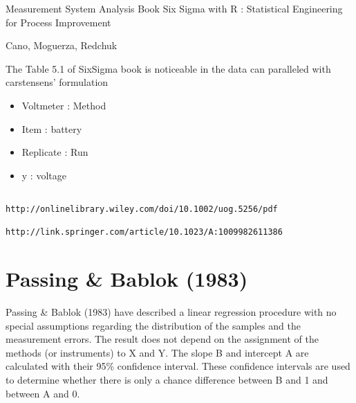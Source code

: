 \documentclass{article}
\title{}
\author{}
\begin{document}
\maketitle

\begin{abstract}

\end{abstract}




Measurement System Analysis 
Book Six Sigma with R : Statistical Engineering for Process Improvement

Cano, Moguerza, Redchuk


The Table 5.1 of SixSigma book is noticeable in the data can paralleled with carstensens' formulation

\begin{itemize}
	\item Voltmeter : Method 
	\item Item : battery
	\item Replicate : Run
	\item y : voltage
\end{itemize}


\begin{framed}
	\begin{verbatim}

http://onlinelibrary.wiley.com/doi/10.1002/uog.5256/pdf

http://link.springer.com/article/10.1023/A:1009982611386	
	\end{verbatim}
	\end{framed}
	


\section*{Passing \& Bablok (1983)}
Passing \& Bablok (1983) have described a linear regression procedure with no special assumptions regarding the distribution of the samples and the measurement errors. The result does not depend on the assignment of the methods (or instruments) to X and Y. The slope B and intercept A are calculated with their 95\% confidence interval. These confidence intervals are used to determine whether there is only a chance difference between B and 1 and between A and 0.
\end{document}
